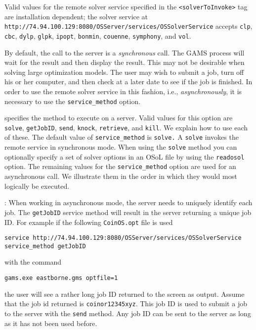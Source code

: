 \iffalse
If, for example,  the {\tt CoinOS.opt} file is
\begin{verbatim}
solver ipopt
service http://74.94.100.129:8080/OSServer/services/OSSolverService
readosol  solveroptions.osol
writeosrl temp.osrl
\end{verbatim}
then {\tt Ipopt} is ignored as a solver option and the remote server uses the {\tt  SYMPHONY} solver.
\fi  
Valid values for the remote solver service specified in the {\tt <solverToInvoke>} tag are 
installation dependent; the solver service at 
{\tt http://74.94.100.129:8080/OSServer/services/OSSolverService} accepts
{\tt clp},  
{\tt cbc},  {\tt dylp}, {\tt glpk}, {\tt ipopt}, {\tt bonmin},   {\tt couenne},  {\tt symphony}, and 
{\tt vol}.  


\medskip



By default, the call to the server is a {\it synchronous} call. The GAMS process will wait for the result 
and then display the result. This may not be desirable when solving large optimization models.  
The user may wish to submit a job, turn off his or her computer,  and then check at a later date to see 
if the job is finished.  In order to use the remote solver service in this fashion, i.e., 
{\it asynchronously}, it  is necessary to use the  {\tt service\_method} option.

\vskip 8pt
 specifies the method to execute on a server.  
Valid values for this option are {\tt solve}, {\tt getJobID}, {\tt send}, {\tt knock}, {\tt retrieve}, 
and {\tt kill}. We explain how to use each of these.
\vskip 8pt
The default value of {\tt service\_method} is {\tt solve.} A {\tt solve} invokes the remote service 
in synchronous mode. When using the {\tt solve} method you can optionally specify a set of solver options 
in an OSoL file  by using the {\tt readosol} option. The  remaining values for the {\tt service\_method} 
option are used for an asynchronous call.  We illustrate them in the order in which they would most 
logically be executed. 

\vskip 8pt
: When working in asynchronous mode, the server needs to 
uniquely identify each job. The {\tt getJobID} service method will result in the server returning 
a unique job ID. For example if the following {\tt CoinOS.opt} file is used
\vskip 8pt
\begin{verbatim}
service http://74.94.100.129:8080/OSServer/services/OSSolverService
service_method getJobID
\end{verbatim}
with the command
\begin{verbatim}
gams.exe eastborne.gms optfile=1
\end{verbatim}
the user will see a rather long job ID returned to the screen as output. Assume that the job id returned 
is {\tt coinor12345xyz}. This job ID is used to submit a job to the server with the {\tt send} method.
Any job ID can be sent to the server as long as it has not been used before.  

